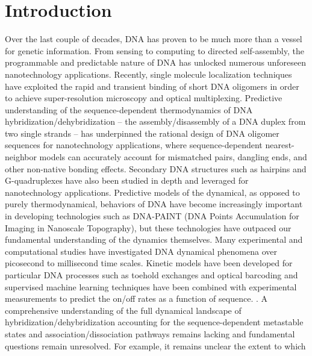 \documentclass[journal=jpcbfk,manuscript=article]{achemso}
\newcommand*{\rood}[1]{{#1}}
\begin{document}

\newpage

\section{\label{sec:intro}Introduction}

Over the last couple of decades, DNA has proven to be much more than a vessel for genetic information. From sensing to computing to directed self-assembly, the programmable and predictable nature of DNA has unlocked numerous unforeseen nanotechnology applications.\citep{Seeman2017DNANanotechnology, Adleman1994MolecularProblems, Rothemund2006FoldingPatterns, Gu2010ALine} Recently, single molecule localization techniques have exploited the rapid and transient binding of short DNA oligomers in order to achieve super-resolution microscopy and optical multiplexing. \cite{Schnitzbauer2017Super-resolutionDNA-PAINT, Shah2019, Strauss2020UpDNA-PAINT} Predictive understanding of the sequence-dependent thermodynamics of DNA hybridization/dehybridization -- the assembly/disassembly of a DNA duplex from two single strands -- has underpinned the rational design of DNA oligomer sequences for nanotechnology applications, where sequence-dependent nearest-neighbor models can accurately account for mismatched pairs, dangling ends, and other non-native bonding effects.\citep{SantaLucia1998AThermodynamics, Santalucia2004TheMotifs} Secondary DNA structures such as hairpins and G-quadruplexes have also been studied in depth and leveraged for nanotechnology applications.\citep{Tsukanov2013DetailedOrigami, Mosayebi2014TheFormation, Mergny2019DNANanotechnology} Predictive models of the dynamical, as opposed to purely thermodynamical, behaviors of DNA have become increasingly important in developing technologies such as DNA-PAINT (DNA Points Accumulation \rood{f}or Imaging \rood{i}n Nanoscale Topography), but these technologies have outpaced our fundamental understanding of the dynamics themselves. \citep{Deluca2020DynamicDevices, Cordes2010SensingTransfer, Naimark2020DNADevelopment} Many experimental and computational studies have investigated DNA dynamical phenomena over picosecond to millisecond time scales.\citep{Yin2011KineticsHybridization, Xiao2019, Hinckley2014Coarse-grainedEffects, Sanstead2016, Porschke1971CooperativeTransition} Kinetic models have been developed for particular DNA processes such as toehold exchanges and optical barcoding \citep{Zhang2009ControlExchange, Shah2019ProgrammingFingerprinting} and supervised machine learning techniques have been combined with experimental measurements to predict the on/off rates as a function of sequence. \citep{Schickinger2018TetheredHelices, Zhang2018PredictingSequence, Shah2019}. A comprehensive understanding of the full dynamical landscape of hybridization/dehybridization accounting for the sequence-dependent metastable states and association/dissociation pathways remains lacking and fundamental questions remain unresolved. For example, it remains unclear the extent to which 
\end{document}
